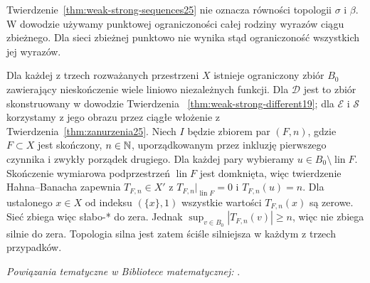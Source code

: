 \begin{uwaga}
\label{rem:sequence-net25}
Twierdzenie~\ref{thm:weak-strong-sequences25} nie oznacza
równości topologii $\sigma$ i $\beta$.
W dowodzie używamy punktowej ograniczoności całej
rodziny wyrazów ciągu zbieżnego. Dla sieci zbieżnej
punktowo nie wynika stąd ograniczoność wszystkich
jej wyrazów.

Dla każdej z trzech rozważanych przestrzeni $X$
istnieje ograniczony zbiór $B_0$ zawierający nieskończenie
wiele liniowo niezależnych funkcji. Dla $\mathcal D$
jest to zbiór skonstruowany w dowodzie Twierdzenia~
\ref{thm:weak-strong-different19}; dla $\mathcal E$
i $\mathcal S$ korzystamy z jego obrazu przez ciągłe
włożenie z Twierdzenia~\ref{thm:zanurzenia25}.
Niech $I$ będzie zbiorem par $(F,n)$, gdzie
$F\subset X$ jest skończony, $n\in\mathbb N$, uporządkowanym
przez inkluzję pierwszego czynnika i zwykły porządek
drugiego. Dla każdej pary wybieramy
$u\in B_0\setminus\operatorname{lin}F$.
Skończenie wymiarowa podprzestrzeń $\operatorname{lin}F$
jest domknięta, więc twierdzenie Hahna--Banacha
zapewnia $T_{F,n}\in X'$ z
$T_{F,n}|_{\operatorname{lin}F}=0$ i $T_{F,n}(u)=n$.
Dla ustalonego $x\in X$ od indeksu $(\{x\},1)$
wszystkie wartości $T_{F,n}(x)$ są zerowe.
Sieć zbiega więc słabo-* do zera. Jednak
$\sup_{v\in B_0}|T_{F,n}(v)|\ge n$, więc
nie zbiega silnie do zera. Topologia silna
jest zatem ściśle silniejsza w każdym z trzech przypadków.
\end{uwaga}

\noindent\emph{Powiązania tematyczne w Bibliotece matematycznej:} .

